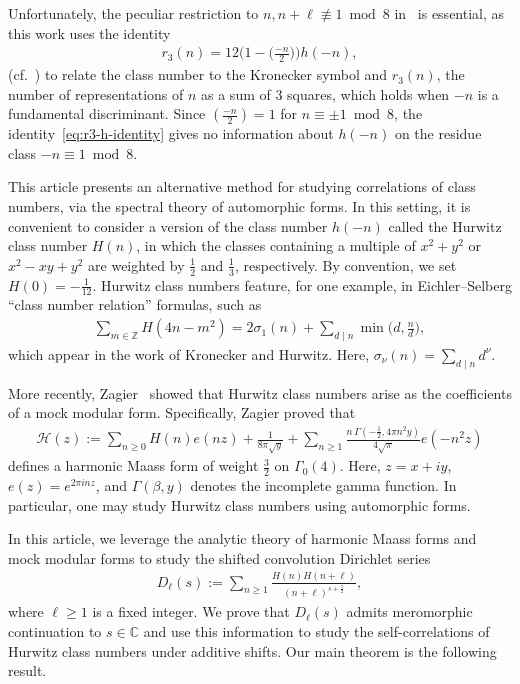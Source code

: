 \documentclass[11pt,reqno]{amsart}
\theoremstyle{plain}
\theoremstyle{definition}
\numberwithin{equation}{section}
\begin{document}
Unfortunately, the peculiar restriction to $n, n+\ell \not\equiv 1 \bmod 8$ in~\cite{Kumaraswamy18} is essential, as this work uses the identity
\begin{align} \label{eq:r3-h-identity}
	r_3(n)  = 12 \Big( 1 - \Big(\frac{-n}{2}\Big)\Big) h(-n),
\end{align}
(cf.~\cite[Proposition 5.3.10]{Cohen93})
to relate the class number to the Kronecker symbol and $r_3(n)$, the number of representations of $n$ as a sum of $3$ squares, which holds when $-n$ is a fundamental discriminant. Since $(\frac{-n}{2}) = 1$ for $n \equiv \pm 1 \bmod 8$, the identity~\eqref{eq:r3-h-identity} gives no information about $h(-n)$ on the residue class $-n \equiv 1 \bmod 8$. 

This article presents an alternative method for studying correlations of class numbers, via the spectral theory of automorphic forms. In this setting, it is convenient to consider a version of the class number $h(-n)$ called the Hurwitz class number $H(n)$, in which the classes containing a multiple of $x^2+y^2$ or $x^2-xy+y^2$ are weighted by $\frac{1}{2}$ and $\frac{1}{3}$, respectively. By convention, we set $H(0) = - \frac{1}{12}$.
Hurwitz class numbers feature, for one example, in Eichler--Selberg ``class number relation'' formulas, such as
\begin{align} \label{eq:class-number-relation}
	\sum_{m \in \mathbb{Z}} H(4n-m^2) = 2 \sigma_1(n) + \sum_{d \mid n} \min\big(d, \frac{n}{d}\big),
\end{align}
which appear in the work of Kronecker and Hurwitz. Here, $\sigma_\nu(n) = \sum_{d \mid n} d^\nu$.

More recently, Zagier~\cite{Zagier75} showed that Hurwitz class numbers arise as the coefficients of a mock modular form. Specifically, Zagier proved that
\begin{align} \label{eq:H-definition}
	\mathcal{H}(z) := 
		\sum_{n \geq 0} H(n) e(nz) + \frac{1}{8\pi \sqrt{y}}
		+ \sum_{n \geq 1} \frac{n \,\Gamma(-\tfrac{1}{2}, 4\pi n^2 y)}{4\sqrt{\pi}} e(-n^2 z)
\end{align}
defines a harmonic Maass form of weight $\frac{3}{2}$ on $\Gamma_0(4)$. Here, $z=x+iy$, $e(z) = e^{2\pi i n z}$, and $\Gamma(\beta, y)$ denotes the incomplete gamma function. In particular, one may study Hurwitz class numbers using automorphic forms.

In this article, we leverage the analytic theory of harmonic Maass forms and mock modular forms to study the shifted convolution Dirichlet series
\begin{align} \label{eq:D_h-definition}
	D_\ell(s) :=
		\sum_{n \geq 1} \frac{H(n) H(n+\ell)}{(n+\ell)^{s+\frac{1}{2}}},
\end{align}
where $\ell \geq 1$ is a fixed integer. We prove that $D_\ell(s)$ admits meromorphic continuation to $s \in \mathbb{C}$ and use this information to study the self-correlations of Hurwitz class numbers under additive shifts. Our main theorem is the following result.
\end{document}
